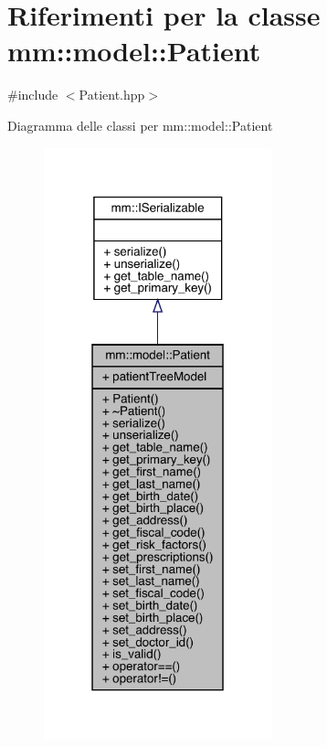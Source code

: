 \hypertarget{classmm_1_1model_1_1_patient}{}\section{Riferimenti per la classe mm\+:\+:model\+:\+:Patient}
\label{classmm_1_1model_1_1_patient}


{\ttfamily \#include $<$Patient.\+hpp$>$}



Diagramma delle classi per mm\+:\+:model\+:\+:Patient\nopagebreak
\begin{figure}[H]
\begin{center}
\leavevmode
\includegraphics[width=187pt]{d0/d42/classmm_1_1model_1_1_patient__inherit__graph}
\end{center}
\end{figure}


